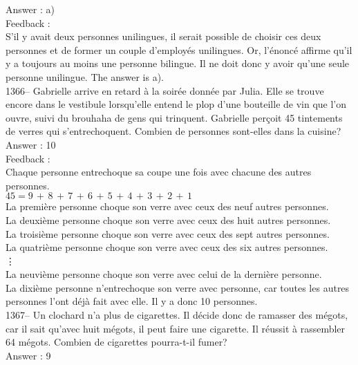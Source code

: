 \documentclass[letterpaper, 12pt]{article}
\begin{document}
Answer : a)\\

Feedback : \\
S'il y avait deux personnes unilingues, il serait possible de choisir ces
deux personnes et de former un couple d'employ\'es unilingues.  Or,
l'\'enonc\'e affirme qu'il y a toujours au moins une personne bilingue.  Il
ne doit donc y avoir qu'une seule personne unilingue.  The answer is
a).\\

1366-- Gabrielle arrive en retard \`a la soir\'ee donn\'ee par Julia.  Elle
se trouve encore dans le vestibule lorsqu'elle entend le plop d'une
bouteille de vin que l'on ouvre, suivi du brouhaha de gens qui trinquent.
Gabrielle per\c coit 45 tintements de verres qui s'entrechoquent.  Combien
de personnes sont-elles dans la cuisine?\\

Answer : 10\\

Feedback :\\
Chaque personne entrechoque sa coupe une fois avec chacune des autres
personnes.  \\
$45=9\,+\,8\,+\,7\,+\,6\,+\,5\,+\,4\,+\,3\,+\,2\,+\,1$\\
La premi\`ere personne choque son verre avec ceux des neuf autres
personnes.\\
La deuxi\`eme personne choque son verre avec ceux des huit autres
personnes.\\
La troisi\`eme personne choque son verre avec ceux des sept autres
personnes.\\
La quatri\`eme personne choque son verre avec ceux des six autres
personnes.\\
\vdots\\
La neuvi\`eme personne choque son verre avec celui de la derni\`ere
personne.\\
La dixi\`eme personne n'entrechoque son verre avec personne, car toutes les
autres personnes l'ont d\'ej\`a fait avec elle.  Il y a donc 10 personnes.\\

1367-- Un clochard n'a plus de cigarettes.  Il d\'ecide donc de ramasser des
m\'egots, car il sait qu'avec huit m\'egots, il peut faire une cigarette.
Il r\'eussit \`a rassembler 64 m\'egots.  Combien de cigarettes pourra-t-il
fumer?\\

Answer : 9\\
\end{document}
